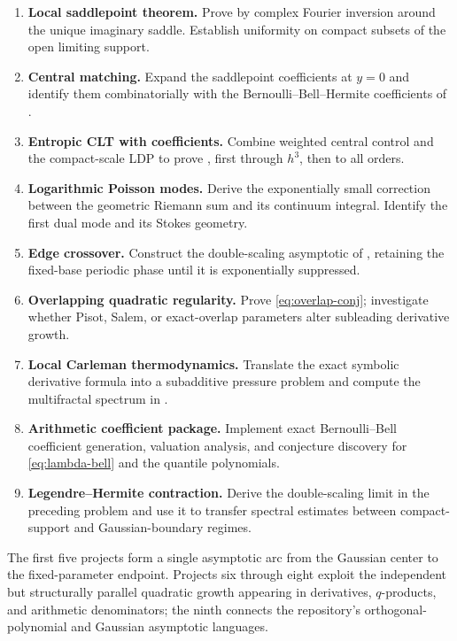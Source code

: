 \documentclass[11pt]{article}
\numberwithin{equation}{section}
\theoremstyle{definition}
\begin{document}
\begin{enumerate}[label=\textbf{P\arabic*.}]
\item \textbf{Local saddlepoint theorem.}  Prove  by complex Fourier inversion around the unique imaginary saddle.  Establish uniformity on compact subsets of the open limiting support.
\item \textbf{Central matching.}  Expand the saddlepoint coefficients at \(y=0\) and identify them combinatorially with the Bernoulli--Bell--Hermite coefficients of .
\item \textbf{Entropic CLT with coefficients.}  Combine weighted central control and the compact-scale LDP to prove , first through \(h^3\), then to all orders.
\item \textbf{Logarithmic Poisson modes.}  Derive the exponentially small correction between the geometric Riemann sum and its continuum integral.  Identify the first dual mode and its Stokes geometry.
\item \textbf{Edge crossover.}  Construct the double-scaling asymptotic of , retaining the fixed-base periodic phase until it is exponentially suppressed.
\item \textbf{Overlapping quadratic regularity.}  Prove \eqref{eq:overlap-conj}; investigate whether Pisot, Salem, or exact-overlap parameters alter subleading derivative growth.
\item \textbf{Local Carleman thermodynamics.}  Translate the exact symbolic derivative formula into a subadditive pressure problem and compute the multifractal spectrum in .
\item \textbf{Arithmetic coefficient package.}  Implement exact Bernoulli--Bell coefficient generation, valuation analysis, and conjecture discovery for \eqref{eq:lambda-bell} and the quantile polynomials.
\item \textbf{Legendre--Hermite contraction.}  Derive the double-scaling limit in the preceding problem and use it to transfer spectral estimates between compact-support and Gaussian-boundary regimes.
\end{enumerate}

The first five projects form a single asymptotic arc from the Gaussian center to the fixed-parameter endpoint.  Projects six through eight exploit the independent but structurally parallel quadratic growth appearing in derivatives, \(q\)-products, and arithmetic denominators; the ninth connects the repository's orthogonal-polynomial and Gaussian asymptotic languages.
\end{document}
